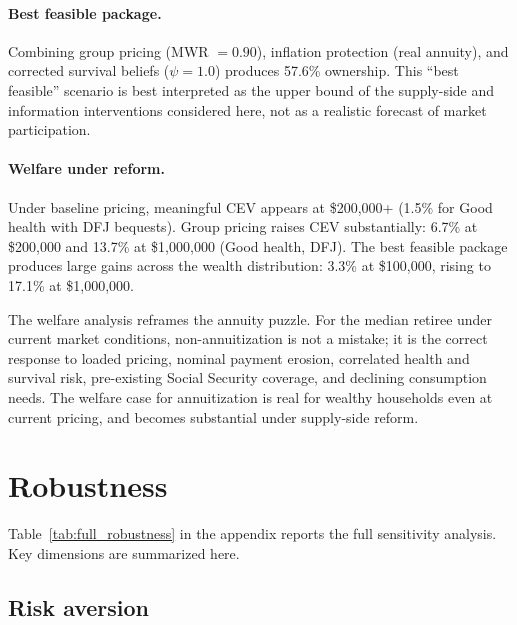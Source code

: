 \documentclass[12pt]{article}
\begin{document}


\paragraph{Best feasible package.} Combining group pricing (MWR $= 0.90$), inflation protection (real annuity), and corrected survival beliefs ($\psi = 1.0$) produces 57.6\% ownership. This ``best feasible'' scenario is best interpreted as the upper bound of the supply-side and information interventions considered here, not as a realistic forecast of market participation.



\paragraph{Welfare under reform.} Under baseline pricing, meaningful CEV appears at \$200,000+ (1.5\% for Good health with DFJ bequests). Group pricing raises CEV substantially: 6.7\% at \$200,000 and 13.7\% at \$1,000,000 (Good health, DFJ). The best feasible package produces large gains across the wealth distribution: 3.3\% at \$100,000, rising to 17.1\% at \$1,000,000.

The welfare analysis reframes the annuity puzzle. For the median retiree under current market conditions, non-annuitization is not a mistake; it is the correct response to loaded pricing, nominal payment erosion, correlated health and survival risk, pre-existing Social Security coverage, and declining consumption needs. The welfare case for annuitization is real for wealthy households even at current pricing, and becomes substantial under supply-side reform.


\section{Robustness}
\label{sec:robustness}

Table~\ref{tab:full_robustness} in the appendix reports the full sensitivity analysis. Key dimensions are summarized here.

\subsection{Risk aversion}
\end{document}
